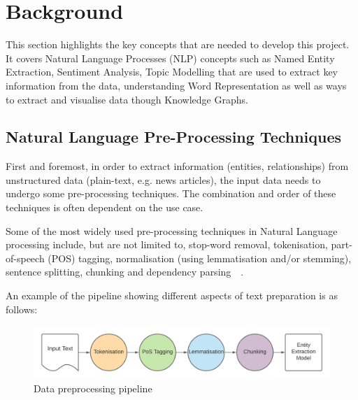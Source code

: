 \chapter{Background}

This section highlights the key concepts that are needed to develop this project. It covers Natural Language Processes (NLP) concepts such as Named Entity Extraction, Sentiment Analysis, Topic Modelling that are used to extract key information from the data, understanding Word Representation as well as ways to extract and visualise data though Knowledge Graphs.


\section{Natural Language Pre-Processing Techniques}

First and foremost, in order to extract information (entities, relationships) from unstructured data (plain-text, e.g. news articles), the input data needs to undergo some pre-processing techniques. The combination and order of these techniques is often dependent on the use case.

Some of the most widely used pre-processing techniques in Natural Language processing include, but are not limited to, stop-word removal, tokenisation, part-of-speech (POS) tagging, normalisation (using lemmatisation and/or stemming), sentence splitting, chunking and dependency parsing~\cite{kannan2014preprocessing}~\cite{ieee_named_entity}.

An example of the pipeline showing different aspects of text preparation is as follows:

\begin{figure}[H]
\centering
\includegraphics[scale=0.15]{images/sentence chaining}
\caption{Data preprocessing pipeline}
\end{figure}

